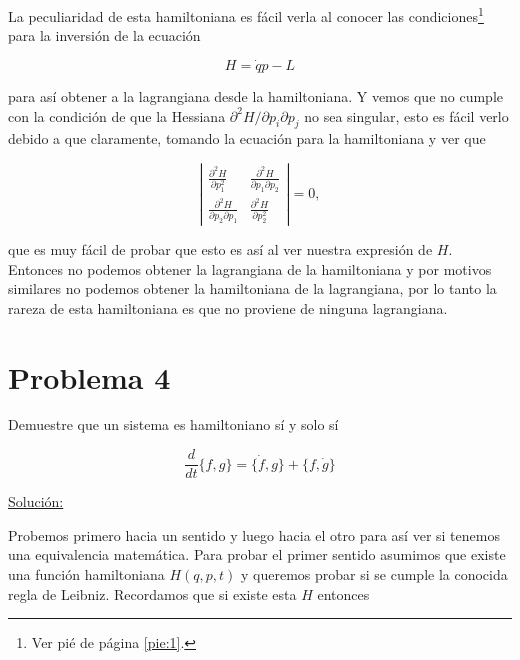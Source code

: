 \documentclass[a4paper,10pt]{article}
\numberwithin{equation}{section}
\begin{document}
\vspace{.3cm}

La peculiaridad de esta hamiltoniana es fácil verla al conocer las condiciones\footnote{Ver pié 
de página \ref{pie:1}.} para la inversión de la ecuación

\begin{equation}
 H = \dot{q}p - L
\end{equation}

para así obtener a la lagrangiana desde la hamiltoniana. Y vemos que no cumple con la 
condición de que la Hessiana $\partial^2 H/\partial p_i \partial p_j$ no sea singular, 
esto es fácil verlo debido a que claramente, tomando la ecuación para la hamiltoniana 
y ver que 

\begin{equation}
 \left|\begin{matrix}
  \frac{\partial^2 H}{\partial p_1^2} & \frac{\partial^2 H}{\partial p_1 \partial p_2} \\
  \frac{\partial^2 H}{\partial p_2 \partial p_1} & \frac{\partial^2 H}{\partial p_2^2}
 \end{matrix}\right| = 0,
\end{equation}

que es muy fácil de probar que esto es así al ver nuestra expresión de $H$. Entonces 
no podemos obtener la lagrangiana de la hamiltoniana y por motivos similares no podemos 
obtener la hamiltoniana de la lagrangiana, por lo tanto la rareza de esta hamiltoniana 
es que no proviene de ninguna lagrangiana.



\section{Problema 4}

Demuestre que un sistema es hamiltoniano sí y solo sí

$$
\frac{d}{dt}\{f,g\} = \{\dot{f},g\} + \{f,\dot{g}\}
$$

\vspace{.3cm}

\underline{Solución:} \vspace{.3cm}

Probemos primero hacia un sentido y luego hacia el otro para así ver si tenemos una equivalencia 
matemática. Para probar el primer sentido asumimos que existe una función hamiltoniana 
$H(q,p,t)$ y queremos probar si se cumple la conocida regla de Leibniz. Recordamos 
que si existe esta $H$ entonces 
\end{document}
